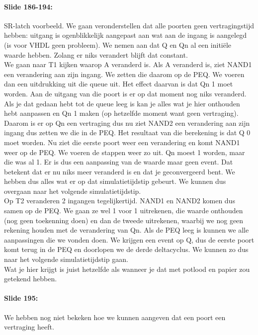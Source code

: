 \documentclass[10pt,a4paper]{book}
\begin{document}
\paragraph{Slide 186-194:} SR-latch voorbeeld. We gaan veronderstellen dat alle poorten geen vertragingstijd hebben: uitgang is ogenblikkelijk aangepast aan wat aan de ingang is aangelegd (is voor VHDL geen probleem).  We nemen aan dat Q en Qn al een initi\"ele waarde hebben. Zolang er niks verandert blijft dat constant.\\
We gaan naar T1 kijken waarop A veranderd is. Als A veranderd is, ziet NAND1 een verandering aan zijn ingang. We zetten die daarom op de PEQ. We voeren dan een uitdrukking uit die queue uit. Het effect daarvan is dat Qn 1 moet worden. Aan de uitgang van die poort is er op dat moment nog niks veranderd. Als je dat gedaan hebt tot de queue leeg is kan je alles wat je hier onthouden hebt aanpassen en Qn 1 maken (op hetzelfde moment want geen vertraging). Daarom is er op Qn een vertraging dus nu ziet NAND2 een verandering aan zijn ingang dus zetten we die in de PEQ. Het resultaat van die berekening is dat Q 0 moet worden. Nu ziet die eerste poort weer een verandering en komt NAND1 weer op de PEQ. We voeren de stappen weer zo uit. Qn moest 1 worden, maar die was al 1. Er is dus een aanpassing van de waarde maar geen event. Dat betekent dat er nu niks meer veranderd is en dat je geconvergeerd bent. We hebben dus alles wat er op dat simulatietijdstip gebeurt. We kunnen dus overgaan naar het volgende simulatietijdstip.\\
Op T2 veranderen 2 ingangen tegelijkertijd. NAND1 en NAND2 komen dus samen op de PEQ. We gaan ze wel 1 voor 1 uitrekenen, die waarde onthouden (nog geen toekenning doen) en dan de tweede uitrekenen, waarbij we nog geen rekening houden met de verandering van Qn. Als de PEQ leeg is kunnen we alle aanpassingen die we vonden doen. We krijgen een event op Q, dus de eerste poort komt terug in de PEQ en doorlopen we de derde deltacyclus. We kunnen zo dus naar het volgende simulatietijdstip gaan.\\
Wat je hier krijgt is juist hetzelfde als wanneer je dat met potlood en papier zou getekend hebben. 

\paragraph{Slide 195:} We hebben nog niet bekeken hoe we kunnen aangeven dat een poort een vertraging heeft.
\end{document}
